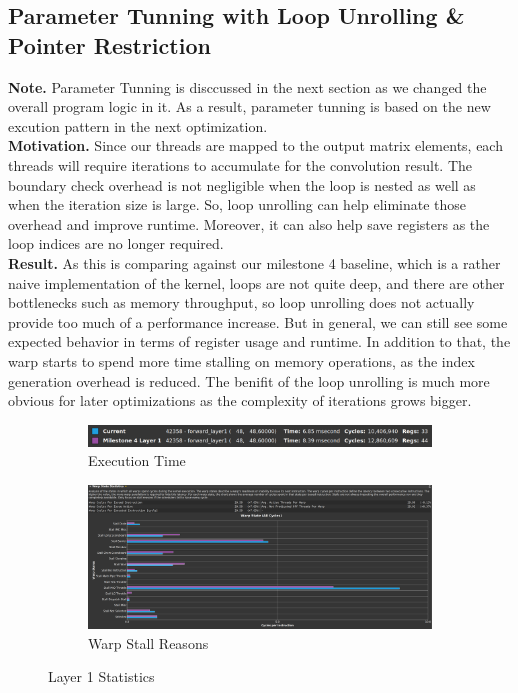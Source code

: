 \documentclass{article}
\begin{document}
\subsection{Parameter Tunning with Loop Unrolling \& Pointer Restriction}

\textbf{Note.} Parameter Tunning is disccussed in the next section as we changed
the overall program logic in it. As a result, parameter tunning is based on
the new excution pattern in the next optimization.\\

\textbf{Motivation.} Since our threads are mapped to the output matrix elements,
each threads will require iterations to accumulate for the convolution result.
The boundary check overhead is not negligible when the loop is nested as well as
when the iteration size is large. So, loop unrolling can help eliminate those overhead
and improve runtime. Moreover, it can also help save registers as the loop indices
are no longer required.\\

\textbf{Result.} As this is comparing against our milestone 4 baseline, which is
a rather naive implementation of the kernel, loops are not quite deep, and there
are other bottlenecks such as memory throughput, so loop unrolling does not actually
provide too much of a performance increase. But in general, we can still see some
expected behavior in terms of register usage and runtime. In addition to that,
the warp starts to spend more time stalling on memory operations, as the index generation
overhead is reduced. The benifit of the loop unrolling is
much more obvious for later optimizations as the complexity of iterations grows bigger.\\

\begin{figure}[H]
    \centering
    \begin{subfigure}[b]{\linewidth}
        \includegraphics[width=\linewidth]{pragma_layer1_summary}
        \caption{Execution Time}
    \end{subfigure}
    \begin{subfigure}[b]{\linewidth}
        \includegraphics[width=\linewidth]{pragma_layer1_warp}
        \caption{Warp Stall Reasons}
    \end{subfigure}
    \caption{Layer 1 Statistics}
\end{figure}
\end{document}
